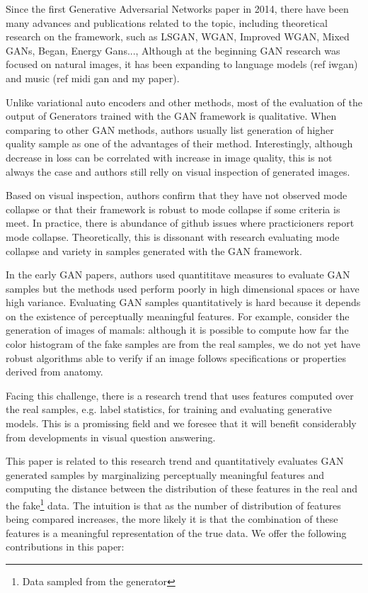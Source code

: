 Since the first Generative Adversarial Networks paper in 2014, there have been
many advances and publications related to the topic, including theoretical
research on the framework, such as LSGAN, WGAN, Improved WGAN, Mixed GANs,
Began, Energy Gans..., Although at the beginning GAN research was focused on
natural images, it has been expanding to language models (ref iwgan) and music
(ref midi gan and my paper). 

Unlike variational auto encoders and other methods, most of the evaluation of the output
of Generators trained with the GAN framework is qualitative. When comparing to other GAN 
methods, authors usually list generation of higher quality sample as one of 
the advantages of their method. Interestingly, although decrease in
loss can be correlated with increase in image quality, this is not always the
case and authors still relly on visual inspection of generated images.

Based on visual inspection, authors confirm that they have not observed
mode collapse or that their framework is robust to mode collapse if some
criteria is meet. In practice, there is abundance of github issues where
practicioners report mode collapse. Theoretically, this is dissonant with
research evaluating mode collapse and variety in samples generated with the
GAN framework.  

In the early GAN papers, authors used quantititave measures to evaluate GAN 
samples but the methods used perform poorly in high dimensional spaces or have 
high variance. Evaluating GAN samples quantitatively is hard because it depends
on the existence of perceptually meaningful features. For example, consider the 
generation of images of mamals: although it is possible to compute how far the
color histogram of the fake samples are from the real samples, we do not yet
have robust algorithms able to verify if an image follows specifications or 
properties derived from anatomy. 

Facing this challenge, there is a research trend that uses features computed over the 
real samples, e.g. label statistics, for training and evaluating generative 
models. This is a promissing field and we foresee that it will benefit
considerably from developments in visual question answering.

This paper is related to this research trend and quantitatively evaluates GAN generated
samples by marginalizing perceptually meaningful features and computing the
distance between the distribution of these features in the real and
the fake\footnote{Data sampled from the generator} data. The intuition is that
as the number of distribution of features being compared increases, the more likely it is
that the combination of these features is a meaningful representation of the true
data. We offer the following contributions in this paper:

